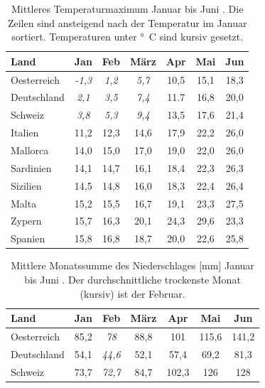\documentclass[a4paper,DIV13,BCOR0cm]{scrartcl}
\begin{document}
\begin{table}
        \centering
        \begin{tabular}{lcccccc}
                \toprule
                 Land & Jan & Feb & März & Apr & Mai & Jun \\
                 \midrule
                 Oesterreich     & \textit{-1,3} & \textit{1,2} & \textit{5,7} & 10,5 & 15,1 & 18,3 \\
                 Deutschland    & \textit{2,1} & \textit{3,5} & \textit{7,4} & 11.7 & 16,8 & 20,0 \\
                 Schweiz        & \textit{3,8} & \textit{5,3} & \textit{9,4} & 13,5 & 17,6 & 21,4 \\
                 Italien        & 11,2 & 12,3 & 14,6 & 17,9 & 22,2 & 26,0 \\
                Mallorca        & 14,0 & 15,0 & 17,0 & 19,0 & 22,0 & 26,0 \\
                Sardinien   & 14,1 & 14,7 & 16,1 & 18,4 & 22,3 & 26,3 \\
                Sizilien    & 14,5 & 14,8 & 16,0 & 18,3 & 22,4 & 26,4 \\
                Malta       & 15,2 & 15,5 & 16,7 & 19,1 & 23,3 & 27,5 \\
                 Zypern         & 15,7 & 16,3 & 20,1 & 24,3 & 29,6 & 23,3\\
                 Spanien        & 15,8 & 16,8 & 18,7 & 20,0 & 22,6 & 25,8 \\
                 \bottomrule
        \end{tabular}
        \caption{
            Mittleres Temperaturmaximum Januar bis Juni \protect\cite{rtl2015klima}.
            Die Zeilen sind ansteigend nach der Temperatur im Januar sortiert.
            Temperaturen unter \protect\unit[10]{\degree C} sind kursiv gesetzt.
            }
        \label{tab:tempmax}
\end{table}


\begin{table}
        \centering
        \begin{tabular}{lcccccc}
                \toprule
                 Land & Jan & Feb & März & Apr & Mai & Jun \\
                 \midrule
                 Oesterreich     & 85,2 & \textit{78} & 88,8 & 101 & 115,6 & 141,2 \\
                 Deutschland    & 54,1 & \textit{44,6} & 52,1 & 57,4 & 69,2 & 81,3 \\
                 Schweiz        & 73,7 & \textit{72,7} & 84,7 & 102,3 & 126 & 128 \\
                 \bottomrule
        \end{tabular}
        \caption{
                Mittlere Monatssumme des Niederschlages [mm] Januar bis Juni \protect\cite{rtl2015klima}.
                Der durchschnittliche trockenste Monat (kursiv) ist der Februar.
            }
        \label{tab:niederschlag}
\end{table}
\end{document}
